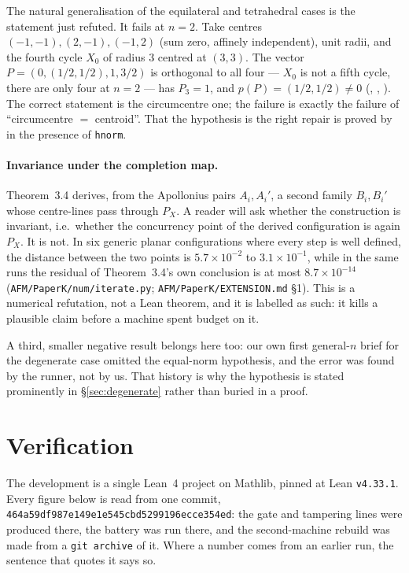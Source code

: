 \documentclass[11pt]{article}
\theoremstyle{definition}
\theoremstyle{remark}
\newcommand{\pkcommit}{464a59df987e149e1e545cbd5299196ecce354ed}
\begin{document}
\noindent The natural generalisation of the equilateral and tetrahedral cases is the statement just
refuted. It fails at $n=2$. Take centres $(-1,-1),(2,-1),(-1,2)$ (sum zero,
affinely independent), unit radii, and the fourth cycle $X_0$ of radius $3$ centred at $(3,3)$. The
vector $P=(0,(1/2,1/2),1,3/2)$ is orthogonal to all four --- $X_0$ is not a fifth cycle, there are
only four at $n=2$ --- has $P_3=1$, and $p(P)=(1/2,1/2)\neq0$
(, , ). The
correct statement is the circumcentre one; the failure is exactly the failure of
``circumcentre $=$ centroid''. That the hypothesis is the right repair is proved by
 in the presence of \texttt{hnorm}.

\paragraph{Invariance under the completion map.} Theorem~3.4 derives, from the Apollonius pairs
$A_i,A_i'$, a second family $B_i,B_i'$ whose centre-lines pass through $P_X$. A reader will ask
whether the construction is invariant, i.e.\ whether the concurrency point of the derived
configuration is again $P_X$. It is not. In six generic planar configurations where every step is
well defined, the distance between the two points is $5.7\times10^{-2}$ to $3.1\times10^{-1}$, while
in the same runs the residual of Theorem~3.4's own conclusion is at most $8.7\times10^{-14}$
(\texttt{AFM/PaperK/num/iterate.py}; \texttt{AFM/PaperK/EXTENSION.md} \S1). This is a numerical
refutation, not a Lean theorem, and it is labelled as such: it kills a plausible claim before a
machine spent budget on it.

A third, smaller negative result belongs here too: our own first general-$n$ brief for the
degenerate case omitted the equal-norm hypothesis, and the error was found by the runner, not by us.
That history is why the hypothesis is stated prominently in \S\ref{sec:degenerate} rather than
buried in a proof.

\section{Verification}\label{sec:verification}

The development is a single Lean~4 project on Mathlib, pinned at Lean \texttt{v4.33.1}. Every figure below is
read from one commit, \texttt{\pkcommit}: the gate and tampering lines were produced there, the
battery was run there, and the second-machine rebuild was made from a \texttt{git archive} of it.
Where a number comes from an earlier run, the sentence that quotes it says so.
\end{document}
